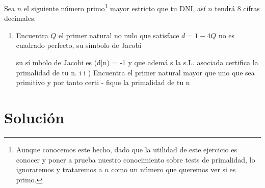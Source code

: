 	Sea $n$ el siguiente número primo\footnote{Aunque conocemos este hecho, dado que la utilidad de este ejercicio
	es conocer y poner a prueba nuestro conocimiento sobre tests de primalidad, lo ignoraremos y trataremos a $n$
	como un número que queremos ver si es primo.} mayor estricto que tu DNI, así $n$ tendrá 8 cifras decimales.

	\begin{enumerate}
	\item Encuentra $Q$ el primer natural no nulo que satisface $d=1-4Q$ no es cuadrado perfecto, su símbolo de Jacobi
	
	
	
	 su
	 sí
	mbolo
	 de
	 Jacobi
	 es
	 (d|n)
	 =
	 -1
	 y
	 que
	 ademá
	s
	 la
	 s.L.
	 asociada
	certifica
	 la
	 primalidad
	 de
	 tu
	 n.
	i
	i
	)
	Encuentra
	 el
	 primer
	 natural
	 mayor
	 que
	 uno
	 que
	 sea
	 primitivo
	 y
	 por
	 tanto
	 certi
	-
	fique
	 la
	 primalidad
	 de
	 tu
	 n
	
	\end{enumerate}

\section*{Solución}
